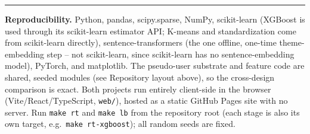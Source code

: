 \documentclass[11pt]{article}
\begin{document}
\vspace{0.4em}
\hrule
\vspace{0.4em}
{\small\textbf{Reproducibility.} Python, pandas, scipy.sparse, NumPy, scikit-learn (XGBoost is used through its scikit-learn estimator API; K-means and standardization come from scikit-learn directly), sentence-transformers (the one offline, one-time theme-embedding step -- not scikit-learn, since scikit-learn has no sentence-embedding model), PyTorch, and matplotlib. The pseudo-user substrate and feature code are shared, seeded modules (see Repository layout above), so the cross-design comparison is exact. Both projects run entirely client-side in the browser (Vite/React/TypeScript, \texttt{web/}), hosted as a static GitHub Pages site with no server. Run \texttt{make rt} and \texttt{make lb} from the repository root (each stage is also its own target, e.g.\ \texttt{make rt-xgboost}); all random seeds are fixed.}
\end{document}
